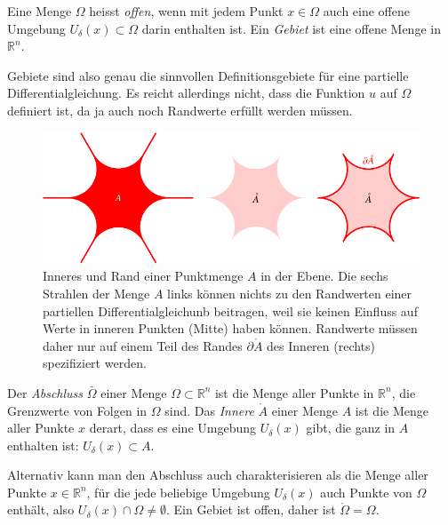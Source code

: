 \begin{definition}
%
%
%
Eine Menge $\Omega$ heisst {\em offen}, wenn mit jedem Punkt $x\in \Omega$
auch eine offene Umgebung $U_{\delta}(x)\subset\Omega$ darin enthalten ist.
Ein {\em Gebiet} ist eine offene Menge in $\mathbb R^n$.
\end{definition}

Gebiete sind also genau die sinnvollen Definitionsgebiete für eine partielle
Differentialgleichung.
%
Es reicht allerdings nicht, dass die Funktion $u$ auf $\Omega$ definiert
ist, da ja auch noch Randwerte erfüllt werden müssen.

\begin{figure}
\centering
\includegraphics{chapters/70-pde/images/gebiet.pdf}
\caption{Inneres und Rand einer Punktmenge $A$ in der Ebene.
Die sechs Strahlen der Menge $A$ links können nichts zu den Randwerten
einer partiellen Differentialgleichunb beitragen, weil sie keinen
Einfluss auf Werte in inneren Punkten (Mitte) haben können.
%
Randwerte müssen daher nur auf einem Teil des Randes $\partial\mathring{A}$
des Inneren (rechts) spezifiziert werden.
\label{buch:pde:figure:gebiet}}
\end{figure}

\begin{definition}
Der {\em Abschluss} $\bar{\Omega}$ einer Menge $\Omega\subset\mathbb R^n$ ist
die Menge aller Punkte in $\mathbb R^n$, die Grenzwerte von Folgen in
$\Omega$ sind.
%
Das {\em Innere} $\mathring{A}$ einer Menge $A$ ist die Menge aller Punkte
$x$ derart, dass es eine Umgebung $U_\delta(x)$ gibt, die ganz in $A$
enthalten ist: $U_{\delta}(x)\subset A$.
%
\end{definition}

Alternativ kann man den Abschluss auch charakterisieren als die Menge
aller Punkte $x\in\mathbb R^n$, für die jede beliebige Umgebung
$U_\delta(x)$ auch Punkte von $\Omega$ enthält, also
$U_\delta(x)\cap \Omega\ne \emptyset$.
Ein Gebiet ist offen, daher ist $\mathring\Omega=\Omega$.


